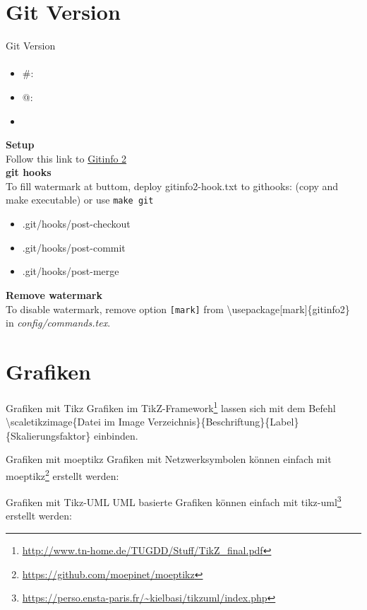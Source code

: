 \documentclass[10pt,aspectratio=\ratio,
compress
]{beamer}
\begin{document}
\section{Git Version}
\begin{frame}{Git Version}\framesubtitle{\gitAbbrevHash}
\begin{itemize}
\item \#: \gitAbbrevHash
\item @: \gitAuthorIsoDate
\item \gitReferences
\end{itemize}
\textbf{Setup}\\
Follow this link to \href{https://www.ctan.org/tex-archive/macros/latex/contrib/gitinfo2}{Gitinfo 2}\\
\textbf{git hooks}\\
  To fill watermark at buttom, deploy gitinfo2-hook.txt to githooks: (copy and make executable) or use \texttt{make git}
  \begin{itemize}
      \item .git/hooks/post-checkout
      \item .git/hooks/post-commit
      \item .git/hooks/post-merge
  \end{itemize}
  \textbf{Remove watermark}\\
  To disable watermark, remove option \texttt{[mark]} from \textbackslash usepackage[mark]\{gitinfo2\} in \textit{config/commands.tex}.
\end{frame}

\section{Grafiken}
\begin{frame}{Grafiken mit Tikz}
  Grafiken im TikZ-Framework\footnote{\url{http://www.tn-home.de/TUGDD/Stuff/TikZ_final.pdf}} lassen sich mit dem Befehl \textbackslash scaletikzimage\{Datei im Image Verzeichnis\}\{Beschriftung\}\{Label\}\{Skalierungsfaktor\} einbinden. 
\end{frame}

\begin{frame}{Grafiken mit moeptikz}
Grafiken mit Netzwerksymbolen können einfach mit moeptikz\footnote{\url{https://github.com/moepinet/moeptikz}} erstellt werden:
\end{frame}

\begin{frame}{Grafiken mit Tikz-UML}
UML basierte Grafiken können einfach mit tikz-uml\footnote{\url{https://perso.ensta-paris.fr/~kielbasi/tikzuml/index.php}} erstellt werden:
\end{frame}
\end{document}

